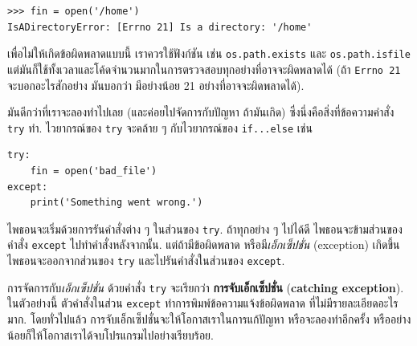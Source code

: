 \begin{verbatim}
>>> fin = open('/home')
IsADirectoryError: [Errno 21] Is a directory: '/home'
\end{verbatim}
%
%
เพื่อไม่ให้เกิดข้อผิดพลาดแบบนี้ 
เราควรใช้ฟังก์ชัน เช่น \texttt{os.path.exists}
และ \texttt{os.path.isfile}
แต่มันก็ใช้ทั้งเวลาและโค้ดจำนวนมากในการตรวจสอบทุกอย่างที่อาจจะผิดพลาดได้ 
(ถ้า \texttt{Errno 21} จะบอกอะไรสักอย่าง
มันบอกว่า มีอย่างน้อย 21 อย่างที่อาจจะผิดพลาดได้).

%
มันดีกว่าที่เราจะลองทำไปเลย (และค่อยไปจัดการกับปัญหา ถ้ามันเกิด)
ซึ่งนึ่งคือสิ่งที่ข้อความคำสั่ง \texttt{try} ทำ.
ไวยากรณ์ของ \texttt{try} จะคล้าย ๆ กับไวยากรณ์ของ \texttt{if...else} เช่น

\begin{verbatim}
try:    
    fin = open('bad_file')
except:
    print('Something went wrong.')
\end{verbatim}
%
%
ไพธอนจะเริ่มด้วยการรันคำสั่งต่าง ๆ ในส่วนของ \texttt{try}.
ถ้าทุกอย่าง ๆ ไปได้ดี ไพธอนจะข้ามส่วนของคำสั่ง \texttt{except}
ไปทำคำสั่งหลังจากนั้น.
แต่ถ้ามีข้อผิดพลาด หรือมี\textit{เอ็กเซ็ปชั่น} (exception) เกิดขึ้น
ไพธอนจะออกจากส่วนของ \texttt{try}
และไปรันคำสั่งในส่วนของ \texttt{except}.

%
การจัดการกับ\textit{เอ็กเซ็ปชั่น} ด้วยคำสั่ง \texttt{try}
จะเรียกว่า \textbf{การจับเอ็กเซ็ปชั่น} (\textbf{catching exception}).
ในตัวอย่างนี้
ตัวคำสั่งในส่วน \texttt{except} ทำการพิมพ์ข้อความแจ้งข้อผิดพลาด 
ที่ไม่มีรายละเอียดอะไรมาก.
โดยทั่วไปแล้ว การจับเอ็กเซ็ปชั่นจะให้โอกาสเราในการแก้ปัญหา หรือจะลองทำอีกครั้ง
หรืออย่างน้อยก็ให้โอกาสเราได้จบโปรแกรมไปอย่างเรียบร้อย.

